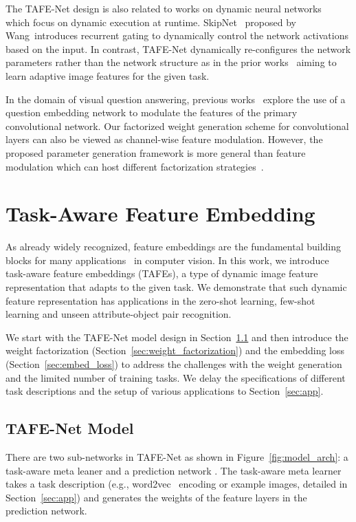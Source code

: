 \documentclass[10pt,twocolumn,letterpaper]{article}
\newcommand{\model}{TAFE-Net\xspace}
\begin{document}
The \model design is also related to works on dynamic neural networks~\cite{wang2018skipnet,wu2018blockdrop,wang2017idk,lin2017runtime} which focus on dynamic execution at runtime. SkipNet~\cite{wang2018skipnet} proposed by Wang~\etal introduces recurrent gating to dynamically control the network activations based on the input. In contrast, \model 
dynamically re-configures the network parameters rather than the network structure as in the prior works~\cite{wang2018skipnet,wu2018blockdrop} aiming to learn adaptive image features for the given task. 

In the domain of visual question answering, previous works~\cite{perez2018film, de2017modulating} explore the use of a question embedding network to modulate the features of the primary convolutional network. Our factorized weight
generation scheme for convolutional layers can also be viewed as channel-wise feature modulation. However, the proposed parameter generation framework is more general than feature modulation which can host different factorization strategies~\cite{bertinetto2016learning}.






 	\section{Task-Aware Feature Embedding}
As already widely recognized, feature embeddings are the fundamental building blocks for many applications~\cite{krizhevsky2012imagenet,long2015fully,girshick2015fast} in 
computer vision. In this work, we introduce task-aware feature embeddings (TAFEs), a type of dynamic image feature representation that adapts to the given task. We demonstrate that such dynamic feature representation has applications in the zero-shot learning, few-shot learning and unseen attribute-object pair recognition.

We start with the \model model design in Section~\ref{sec:model} and then introduce the weight factorization (Section~\ref{sec:weight_factorization}) and the embedding loss (Section~\ref{sec:embed_loss}) to address the
challenges with the weight generation and the limited number of training tasks. We delay the specifications of 
different task descriptions and the setup of various applications to Section~\ref{sec:app}. 

\subsection{\model Model}
\label{sec:model}
There are two sub-networks
in \model as shown in Figure~\ref{fig:model_arch}: a 
task-aware meta leaner  and a prediction network
. The task-aware meta learner takes a task description  (e.g., word2vec~\cite{mikolov2013efficient} encoding or example images, detailed in Section~\ref{sec:app}) and generates the weights of the feature layers in the prediction network. 
\end{document}
